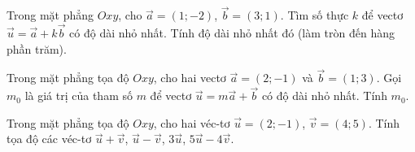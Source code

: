 \begin{bt}%
	Trong mặt phẳng $Oxy$, cho $\overrightarrow{a}=(1;-2)$, $\overrightarrow{b}=(3;1)$. Tìm số thực $k$ để vectơ $\overrightarrow{u}=\overrightarrow{a}+k\overrightarrow{b}$ có độ dài nhỏ nhất. Tính độ dài nhỏ nhất đó (làm tròn đến hàng phần trăm).
	
\end{bt}

\begin{bt}%
Trong mặt phẳng tọa độ $Oxy$, cho hai vectơ $\overrightarrow{a}=(2;-1)$ và $\overrightarrow{b}=(1;3)$. Gọi $m_0$ là giá trị của tham số $m$ để vectơ $\overrightarrow{u}=m\overrightarrow{a}+\overrightarrow{b}$ có độ dài nhỏ nhất. Tính $m_0$.

\end{bt}


\begin{bt}%
	Trong mặt phẳng tọa độ $Oxy$, cho hai véc-tơ $\overrightarrow{u}=(2;-1)$, $\overrightarrow{v}=(4;5)$. Tính tọa độ các véc-tơ $\overrightarrow{u}+\overrightarrow{v}$, $\overrightarrow{u}-\overrightarrow{v}$, $3\overrightarrow{u}$, $5\overrightarrow{u}-4\overrightarrow{v}$.
\end{bt}

